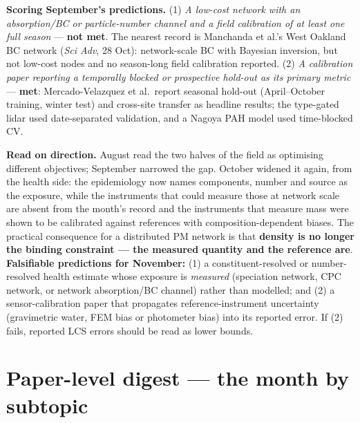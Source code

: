 \documentclass[10pt]{article}
\begin{document}
\vspace{3mm}

\footnotesize
\textbf{Scoring September's predictions.} (1) \textit{A low-cost network with an absorption/BC or
particle-number channel and a field calibration of at least one full season} --- \textbf{not met}.
The nearest record is Manchanda et al.'s West Oakland BC network (\textit{Sci Adv}, 28 Oct): network-scale
BC with Bayesian inversion, but not low-cost nodes and no season-long field calibration reported.
(2) \textit{A calibration paper reporting a temporally blocked or prospective hold-out as its primary
metric} --- \textbf{met}: Mercado-Velazquez et al.\ report seasonal hold-out (April--October training,
winter test) and cross-site transfer as headline results; the type-gated lidar used date-separated
validation, and a Nagoya PAH model used time-blocked CV.

\vspace{1.5mm}
\textbf{Read on direction.} August read the two halves of the field as optimising different objectives;
September narrowed the gap. October widened it again, from the health side: the epidemiology now names
components, number and source as the exposure, while the instruments that could measure those at
network scale are absent from the month's record and the instruments that measure mass were shown to be
calibrated against references with composition-dependent biases. The practical consequence for a
distributed PM network is that \textbf{density is no longer the binding constraint --- the measured
quantity and the reference are}.
\textbf{Falsifiable predictions for November:}
(1) a constituent-resolved or number-resolved health estimate whose exposure is \emph{measured}
(speciation network, CPC network, or network absorption/BC channel) rather than modelled; and
(2) a sensor-calibration paper that propagates reference-instrument uncertainty (gravimetric water,
FEM bias or photometer bias) into its reported error. If (2) fails, reported LCS errors should be read as
lower bounds.

\clearpage

\section*{\sffamily\bfseries\color{Deep}Paper-level digest --- the month by subtopic}
\vspace{-1.5mm}{\color{Coral}\rule{\linewidth}{1.1pt}}\vspace{2mm}
\end{document}
